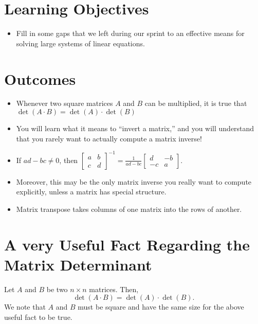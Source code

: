\section*{Learning Objectives}
\begin{itemize}
\item Fill in some gaps that we left during our sprint to an effective means for solving large systems of linear equations. 
\end{itemize}

\section*{Outcomes}
\begin{itemize}
\item Whenever two square matrices $A$ and $B$ can be multiplied, it is true that $\det(A \cdot B) = \det(A) \cdot \det(B)$
\item You will learn what it means to ``invert a matrix,'' and you will understand that you rarely want to actually compute a matrix inverse! 
\item If $ad - b c \neq 0$, then  $\left[\begin{array}{rr} a & b \\ c & d\end{array} \right]^{-1} =  \frac{1}{a d - b c} \left[\begin{array}{rr} d & -b \\ -c & a\end{array} \right]$. 
\item Moreover, this may be the only matrix inverse you really want to compute explicitly, unless a matrix has special structure.
\item Matrix transpose takes columns of one matrix into the rows of another.
\end{itemize}
\newpage


\section{A very Useful Fact Regarding the Matrix Determinant}
\label{sec:DetMatrixproject}

\begin{tcolorbox}
Let $A$ and $B$ be two $n \times n$ matrices. Then,
$$\det(A \cdot B) = \det(A) \cdot \det(B). $$
We note that $A$ and $B$ must be square and have the same size for the above useful fact to be true. 
\end{tcolorbox}

